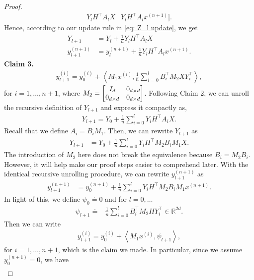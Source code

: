 \documentclass{article}
\newcommand{\R}{\mathbb{R}}
\newcommand{\indot}[2]{{\left<#1, #2\right>}}
\begin{document}
\begin{proof}
\begin{align}
                 Y_l H^\top A_l X & Y_l H^\top A_l x^{(n+1)}].
    \end{align}
    Hence, according to our update rule in \eqref{eq: Z_l update}, we get
    \begin{align}
        Y_{l+1} &= Y_l + \frac{1}{n} Y_l H^\top A_l X\\
        y_{l+1}^{(n+1)} &= y_l^{(n+1)} + \frac{1}{n} Y_l H^\top A_l x^{(n+1)}.
    \end{align}
    \textbf{Claim 3.}
    \begin{align}
      y_{l+1}^{(i)} = y_0^{(i)} + \indot{M_1 x^{(i)}}{\frac{1}{n}\sum_{i=0}^l B_i^\top M_2 X Y_i^\top},
    \end{align}
    for $i = 1, \dots, n+1$, where $M_2 = \mqty[I_{d} & 0_{d\times d}\\ 0_{d\times d} & 0_{d\times d}]$.
    Following Claim 2, we can unroll the recursive definition of $Y_{l+1}$ and express it compactly as,
    \begin{align}
        Y_{l+1} = Y_0 + \frac{1}{n}\sum_{i=0}^l Y_i H^\top A_i X.
    \end{align}
    Recall that we define $A_i = B_i M_1$.
    Then, we can rewrite $Y_{l+1}$ as
    \begin{align}
        Y_{l+1}
        &= Y_0 + \frac{1}{n} \sum_{i=0}^l Y_i H^\top M_2 B_i M_1 X.
    \end{align}
    The introduction of $M_2$ here does not break the equivalence because $B_i = M_2 B_i$.
    However, it will help make our proof steps easier to comprehend later.
    With the identical recursive unrolling procedure, we can rewrite $y_{l+1}^{(n+1)}$ as
    \begin{align}
        y_{l+1}^{(n+1)} &= y_0^{(n+1)} + \frac{1}{n} \sum_{i=0}^l Y_i H^\top M_2 B_i M_1 x^{(n+1)}.
    \end{align}
    In light of this,
    we define $\psi_0 \doteq 0$ and for $l = 0, \dots$
    \begin{align}
      \psi_{l+1} \doteq& \frac{1}{n}\sum_{i=0}^l B_i^\top M_2 H Y_i^\top \in \R^{2d}. \label{eq: lambda theta_l define}
    \end{align}
    Then we can write
    \begin{align}
        y_{l+1}^{(i)} = y_0^{(i)} + \indot{M_1 x^{(i)}}{\psi_{l+1}}, \label{eq: lambda y_l+1 evol theta}
    \end{align}
    for $i=1, \dots, n+1$, which is the claim we made.
    In particular, since we assume $y_0^{(n+1)} = 0$, we have
    \begin{align}

\end{align}
\end{proof}
\end{document}
